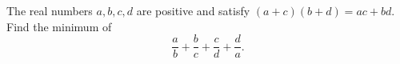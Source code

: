 The real numbers $a,b,c,d$ are positive and satisfy $(a+c)(b+d)=ac+bd$.
Find the minimum of 
$$\frac{a}{b}+\frac{b}{c}+\frac{c}{d}+\frac{d}{a}.$$
